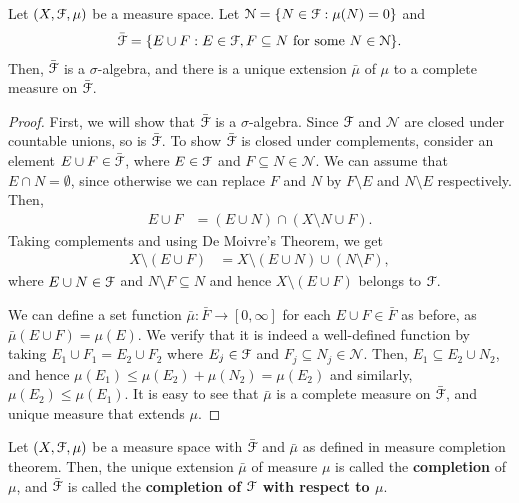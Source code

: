 \documentclass[a4paper,english,12pt]{article}
\begin{document}
\begin{thm}\label{Thm:MeasureCompletion} Let $(X, \mathcal{F}, \mu)$ be a measure space. Let $\mathcal{N} = \{N \in \mathcal{F}: \mu(N) = 0\}$ and 
\begin{align*}
\bar{\mathcal{F}} = \{E \cup F: E \in \mathcal{F}, F\subseteq N \text{ for some } N \in \mathcal{N}\}.
\end{align*}
Then, $\bar{\mathcal{F}}$ is a $\sigma$-algebra, and there is a unique extension $\bar{\mu}$ of $\mu$ to a complete measure on $\bar{\mathcal{F}}$.
\end{thm}
\begin{proof} First, we will show that $\bar{\mathcal{F}}$ is a $\sigma$-algebra. Since $\mathcal{F}$ and $\mathcal{N}$ are closed under countable unions, so is $\bar{\mathcal{F}}$. To show $\bar{\mathcal{F}}$ is closed under complements, consider an element $E \cup F \in \bar{\mathcal{F}}$, where $E \in \mathcal{F}$ and $F \subseteq N \in \mathcal{N}$. We can assume that $E \cap N = \emptyset$, since otherwise we can replace $F$ and $N$ by $F \setminus E$ and $N \setminus E$ respectively. Then, 
\begin{align*}
E \cup F &= (E \cup N) \cap (X \setminus N \cup F).
\end{align*}
Taking complements and using De Moivre's Theorem, we get
\begin{align*}
X \setminus (E \cup F) &=   X \setminus (E \cup N) \cup (N \setminus F),
\end{align*}
where $E \cup N \in \mathcal{F}$ and $N \setminus F \subseteq N$ and hence $X \setminus (E \cup F)$ belongs to $\mathcal{F}$.

We can define a set function $\bar{\mu}: \bar{F} \to [0, \infty]$ for each $E\cup F \in \bar{F}$ as before, as $\bar{\mu}(E \cup F) = \mu(E)$. We verify that it is indeed a well-defined function by taking $E_1 \cup F_1 = E_2 \cup F_2$ where $E_j \in \mathcal{F}$ and $F_j \subseteq N_j \in \mathcal{N}$. Then, $E_1 \subseteq E_2 \cup N_2$, and hence $\mu(E_1) \leq \mu(E_2) + \mu(N_2) = \mu(E_2)$ and similarly, $\mu(E_2) \leq \mu(E_1)$. It is easy to see that $\bar{\mu}$ is a complete measure on $\bar{\mathcal{F}}$, and unique measure that extends $\mu$.
\end{proof}
\begin{defn} Let $(X,\mathcal{F},\mu)$ be a measure space with $\bar{\mathcal{F}}$ and $\bar{\mu}$ as defined in measure completion theorem. Then, the unique extension $\bar{\mu}$ of measure $\mu$ is called the \textbf{completion} of $\mu$, and $\bar{\mathcal{F}}$ is called the \textbf{completion of $\mathcal{F}$ with respect to $\mu$}.
\end{defn}
\end{document}
